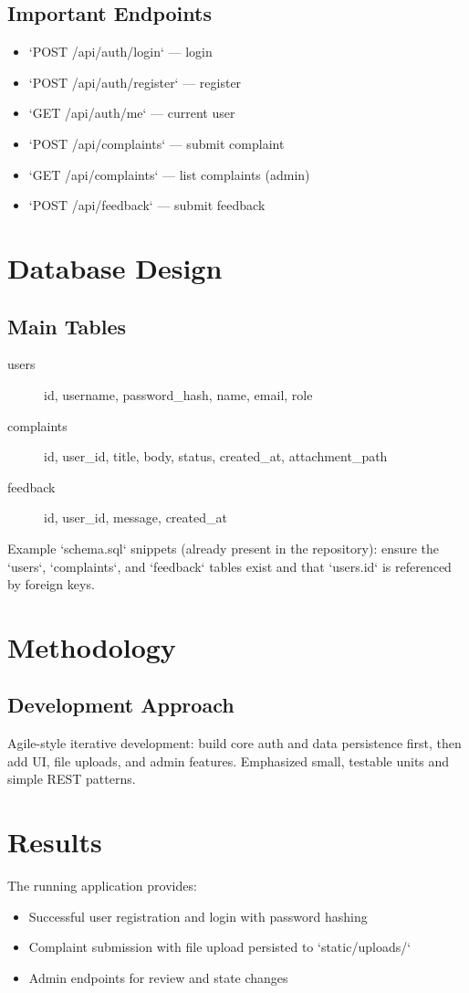 \documentclass[12pt]{report}
\begin{document}
\section{Important Endpoints}
\begin{itemize}
  \item `POST /api/auth/login` — login
  \item `POST /api/auth/register` — register
  \item `GET /api/auth/me` — current user
  \item `POST /api/complaints` — submit complaint
  \item `GET /api/complaints` — list complaints (admin)
  \item `POST /api/feedback` — submit feedback
\end{itemize}

\chapter{Database Design}
\section{Main Tables}
\begin{description}
  \item[users] id, username, password_hash, name, email, role
  \item[complaints] id, user_id, title, body, status, created_at, attachment_path
  \item[feedback] id, user_id, message, created_at
\end{description}

Example `schema.sql` snippets (already present in the repository): ensure the `users`, `complaints`, and `feedback` tables exist and that `users.id` is referenced by foreign keys.

\chapter{Methodology}
\section{Development Approach}
Agile-style iterative development: build core auth and data persistence first, then add UI, file uploads, and admin features. Emphasized small, testable units and simple REST patterns.

\chapter{Results}
The running application provides:
\begin{itemize}
  \item Successful user registration and login with password hashing
  \item Complaint submission with file upload persisted to `static/uploads/`
  \item Admin endpoints for review and state changes
\end{itemize}
\end{document}
